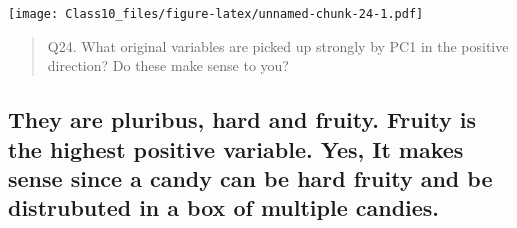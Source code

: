 \documentclass[
]{article}
\begin{document}
\texttt{[image: Class10\_files/figure-latex/unnamed-chunk-24-1.pdf]}

\begin{quote}
Q24. What original variables are picked up strongly by PC1 in the
positive direction? Do these make sense to you?
\end{quote}

\hypertarget{they-are-pluribus-hard-and-fruity.-fruity-is-the-highest-positive-variable.-yes-it-makes-sense-since-a-candy-can-be-hard-fruity-and-be-distrubuted-in-a-box-of-multiple-candies.}{%
\subsection{They are pluribus, hard and fruity. Fruity is the highest
positive variable. Yes, It makes sense since a candy can be hard fruity
and be distrubuted in a box of multiple
candies.}\label{they-are-pluribus-hard-and-fruity.-fruity-is-the-highest-positive-variable.-yes-it-makes-sense-since-a-candy-can-be-hard-fruity-and-be-distrubuted-in-a-box-of-multiple-candies.}}
\end{document}
